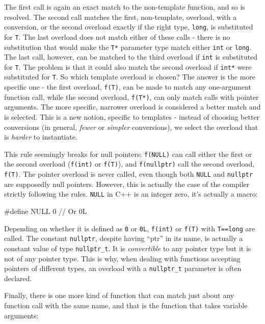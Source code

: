 The first call is again an exact match to the non-template function, and so is resolved. The second call matches the first, non-template, overload, with a conversion, or the second overload exactly if the right type, \texttt{long}, is substituted for \texttt{T}. The last overload does not match either of these calls - there is no substitution that would make the \texttt{T*} parameter type match either \texttt{int} or \texttt{long}. The last call, however, can be matched to the third overload if \texttt{int} is substituted for \texttt{T}. The problem is that it could also match the second overload if \texttt{int*} were substituted for \texttt{T}. So which template overload is chosen? The answer is the more specific one - the first overload, \texttt{f(T)}, can be made to match any one-argument function call, while the second overload, \texttt{f(T*)}, can only match calls with pointer arguments. The more specific, narrower overload is considered a better match and is selected. This is a new notion, specific to templates - instead of choosing better conversions (in general, \emph{fewer} or \emph{simpler} conversions), we select the overload that is \emph{harder} to instantiate.

This rule seemingly breaks for null pointers: \texttt{f(NULL)} can call either the first or the second overload (\texttt{f(int)} or \texttt{f(T)}), and \texttt{f(nullptr)} call the second overload, \texttt{f(T)}. The pointer overload is never called, even though both \texttt{NULL} and \texttt{nullptr} are supposedly null pointers. However, this is actually the case of the compiler strictly following the rules. \texttt{NULL} in C++ is an integer zero, it's actually a macro:

\begin{code}
#define NULL 0 // Or 0L
\end{code}

Depending on whether it is defined as \texttt{0} or \texttt{0L}, \texttt{f(int)} or \texttt{f(T)} with \texttt{T==long} are called. The constant \texttt{nullptr}, despite having ``ptr'' in its name, is actually a constant value of type \texttt{nullptr\_t}. It is \emph{convertible} to any pointer type but it is not of any pointer type. This is why, when dealing with functions accepting pointers of different types, an overload with a \texttt{nullptr\_t} parameter is often declared.

Finally, there is one more kind of function that can match just about any function call with the same name, and that is the function that takes variable arguments:

